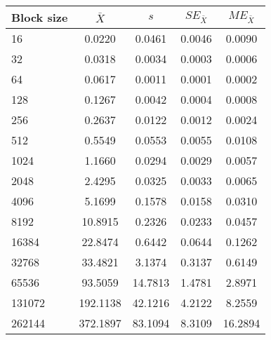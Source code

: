 \begin{tabular}{lcccc}\toprule
{\small Block size} & $\bar{X}$ & $s$ & $SE_{\bar{X}}$ & $ME_{\bar{X}}$ \\\midrule
16 & 0.0220 & 0.0461 & 0.0046 & 0.0090\\
32 & 0.0318 & 0.0034 & 0.0003 & 0.0006\\
64 & 0.0617 & 0.0011 & 0.0001 & 0.0002\\
128 & 0.1267 & 0.0042 & 0.0004 & 0.0008\\
256 & 0.2637 & 0.0122 & 0.0012 & 0.0024\\
512 & 0.5549 & 0.0553 & 0.0055 & 0.0108\\
1024 & 1.1660 & 0.0294 & 0.0029 & 0.0057\\
2048 & 2.4295 & 0.0325 & 0.0033 & 0.0065\\
4096 & 5.1699 & 0.1578 & 0.0158 & 0.0310\\
8192 & 10.8915 & 0.2326 & 0.0233 & 0.0457\\
16384 & 22.8474 & 0.6442 & 0.0644 & 0.1262\\
32768 & 33.4821 & 3.1374 & 0.3137 & 0.6149\\
65536 & 93.5059 & 14.7813 & 1.4781 & 2.8971\\
131072 & 192.1138 & 42.1216 & 4.2122 & 8.2559\\
262144 & 372.1897 & 83.1094 & 8.3109 & 16.2894\\
\bottomrule
\end{tabular}
